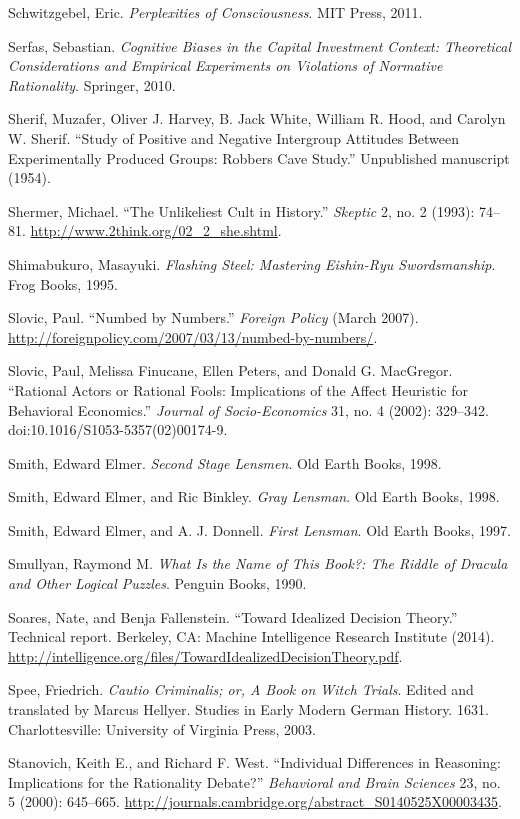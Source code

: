 {
 Schwitzgebel, Eric. \textit{Perplexities of Consciousness}. MIT
Press, 2011.}

{
 Serfas, Sebastian. \textit{Cognitive Biases in the Capital
Investment Context: Theoretical Considerations and Empirical
Experiments on Violations of Normative Rationality}. Springer, 2010.}

{
 Sherif, Muzafer, Oliver J. Harvey, B. Jack White, William R. Hood,
and Carolyn W. Sherif. ``Study of Positive and
Negative Intergroup Attitudes Between Experimentally Produced Groups:
Robbers Cave Study.'' Unpublished manuscript (1954).}

{
 Shermer, Michael. ``The Unlikeliest Cult in
History.'' \textit{Skeptic} 2, no. 2 (1993): 74--81.
\url{http://www.2think.org/02\_2\_she.shtml}.}

{
 Shimabukuro, Masayuki. \textit{Flashing Steel: Mastering
Eishin-Ryu Swordsmanship}. Frog Books, 1995.}

{
 Slovic, Paul. ``Numbed by
Numbers.'' \textit{Foreign Policy} (March 2007).
\url{http://foreignpolicy.com/2007/03/13/numbed-by-numbers/}.}

{
 Slovic, Paul, Melissa Finucane, Ellen Peters, and Donald G.
MacGregor. ``Rational Actors or Rational Fools:
Implications of the Affect Heuristic for Behavioral
Economics.'' \textit{Journal of Socio-Economics} 31,
no. 4 (2002): 329--342. doi:10.1016/S1053-5357(02)00174-9.}

{
 Smith, Edward Elmer. \textit{Second Stage Lensmen}. Old Earth
Books, 1998.}

{
 Smith, Edward Elmer, and Ric Binkley. \textit{Gray Lensman}. Old
Earth Books, 1998.}

{
 Smith, Edward Elmer, and A. J. Donnell. \textit{First Lensman}.
Old Earth Books, 1997.}

{
 Smullyan, Raymond M. \textit{What Is the Name of This Book?: The
Riddle of Dracula and Other Logical Puzzles}. Penguin Books, 1990.}

{
 Soares, Nate, and Benja Fallenstein. ``Toward
Idealized Decision Theory.'' Technical report.
Berkeley, CA: Machine Intelligence Research Institute (2014).
\url{http://intelligence.org/files/TowardIdealizedDecisionTheory.pdf}.}

{
 Spee, Friedrich. \textit{Cautio Criminalis; or, A Book on Witch
Trials}. Edited and translated by Marcus Hellyer. Studies in Early
Modern German History. 1631. Charlottesville: University of Virginia
Press, 2003.}

{
 Stanovich, Keith E., and Richard F. West.
``Individual Differences in Reasoning: Implications
for the Rationality Debate?'' \textit{Behavioral and
Brain Sciences} 23, no. 5 (2000): 645--665.
\url{http://journals.cambridge.org/abstract\_S0140525X00003435}.}

